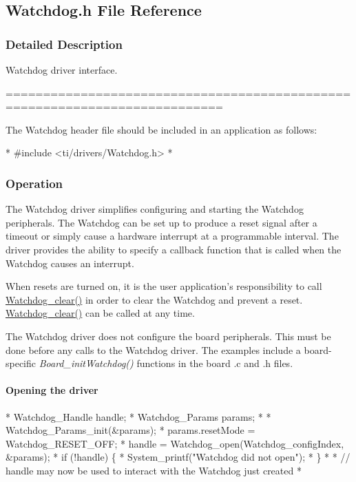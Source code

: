 \subsection{Watchdog.\-h File Reference}
\label{_watchdog_8h}


\subsubsection{Detailed Description}
Watchdog driver interface. \begin{DoxyVerb}===========================================================================
\end{DoxyVerb}


The Watchdog header file should be included in an application as follows\-: 
\begin{DoxyCode}
*  #include <ti/drivers/Watchdog.h>
*  
\end{DoxyCode}


\subsubsection*{Operation}

The Watchdog driver simplifies configuring and starting the Watchdog peripherals. The Watchdog can be set up to produce a reset signal after a timeout or simply cause a hardware interrupt at a programmable interval. The driver provides the ability to specify a callback function that is called when the Watchdog causes an interrupt.

When resets are turned on, it is the user application's responsibility to call \hyperlink{_watchdog_8h_a396decd6b1807db10c636f9987c3be4c}{Watchdog\-\_\-clear()} in order to clear the Watchdog and prevent a reset. \hyperlink{_watchdog_8h_a396decd6b1807db10c636f9987c3be4c}{Watchdog\-\_\-clear()} can be called at any time.

The Watchdog driver does not configure the board peripherals. This must be done before any calls to the Watchdog driver. The examples include a board-\/specific {\itshape Board\-\_\-init\-Watchdog()} functions in the board .c and .h files.

\paragraph*{Opening the driver}


\begin{DoxyCode}
*  Watchdog_Handle     handle;
*  Watchdog_Params     params;
*
*  Watchdog_Params_init(&params);
*  params.resetMode = Watchdog_RESET_OFF;
*  handle = Watchdog_open(Watchdog\_configIndex, &params);
*  \textcolor{keywordflow}{if} (!handle) \{
*      System\_printf(\textcolor{stringliteral}{"Watchdog did not open"});
*  \}
*
*  \textcolor{comment}{// handle may now be used to interact with the Watchdog just created}
*  
\end{DoxyCode}


